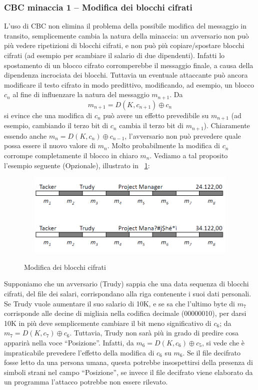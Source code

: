 \subsubsection{CBC minaccia 1 – Modifica dei blocchi cifrati}
L’uso di CBC non elimina il problema della possibile modifica del messaggio in transito, semplicemente cambia la natura della minaccia: un avversario non può più vedere ripetizioni di blocchi cifrati, e non può più copiare/spostare blocchi cifrati (ad esempio per scambiare il salario di due dipendenti). Infatti lo spostamento di un blocco cifrato corromperebbe il messaggio finale, a causa della dipendenza incrociata dei blocchi. Tuttavia un eventuale attaccante può ancora modificare il testo cifrato in modo predittivo, modificando, ad esempio, un blocco $c_{n}$ al fine di influenzare la natura del messaggio $m_{n+1}$. Da
\begin{equation}
m_{n+1} = D(K,c_{n+1})\oplus c_{n}
\end{equation}
si evince che una modifica di $c_{n}$ può avere un effetto prevedibile su $m_{n+1}$ (ad esempio, cambiando il terzo bit di $c_{n}$ cambia il terzo bit di $m_{n+1}$). Chiaramente essendo anche $m_{n} = D(K,c_{n})\oplus c_{n-1}$,  l'avversario non può prevedere quale possa essere il nuovo valore di $m_{n}$. Molto probabilmente la modifica di $c_{n}$ corrompe completamente il blocco in chiaro $m_{n}$. Vediamo a tal proposito l'esempio seguente (Opzionale), illustrato in \figurename~\ref{fig:modifica_blk_cifrati}:
\begin{figure}[htbp]
	\centering%
	\subfigure%
	{\includegraphics[height=4cm, width=12cm, keepaspectratio]{Immagini/modalita_operative/modifica_blk_cifrati.png}}
	\caption{Modifica dei blocchi cifrati \label{fig:modifica_blk_cifrati}}	
\end{figure}
\newline \newline
Supponiamo che un avversario (Trudy) sappia che una data sequenza di blocchi cifrati, del file dei salari, corrispondano alla riga contenente i suoi dati personali. Se Trudy vuole aumentare il suo salario di 10K, e se sa che l'ultimo byte di $m_{7}$ corrisponde alle decine di migliaia nella codifica decimale (00000010), per darsi 10K in più deve semplicemente cambiare il bit meno significativo di $c_{6}$; da $m_{7} = D(K, c_{7}) \oplus c_{6}$. Tuttavia, Trudy non sarà più in grado di predire cosa apparirà nella voce “Posizione”. Infatti, da $m_{6} = D(K, c_{6}) \oplus c_{5}$, si vede che è impraticabile prevedere l'effetto della modifica di $c_{6}$ su $m_{6}$. Se il file decifrato fosse letto da una persona umana, questa potrebbe insospettirsi della presenza di simboli strani nel campo “Posizione”, se invece il file decifrato viene elaborato da un programma l'attacco potrebbe non essere rilevato.
